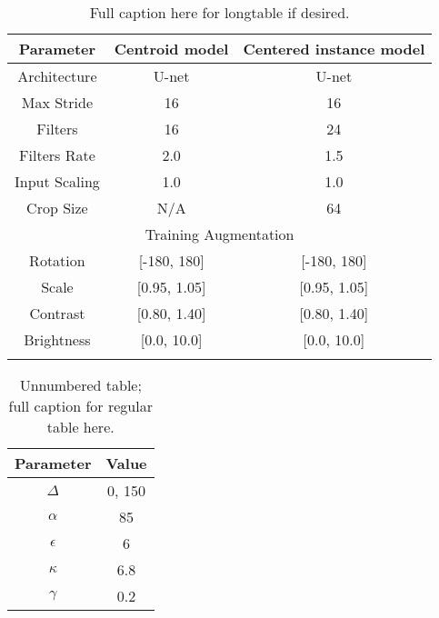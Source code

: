 \begin{longtable}[c]{ c | c c }
    \caption{Short caption heading.\label{tab-values}}\\

    \hline
    Parameter & Centroid model & Centered instance model\\
    \hline
    \endfirsthead

    Architecture & U-net & U-net \\
    Max Stride & 16 & 16 \\
    Filters & 16 & 24 \\
    Filters Rate & 2.0 & 1.5 \\
    Input Scaling & 1.0 & 1.0 \\
    Crop Size & N/A & 64 \\

    \hline
    \multicolumn{3}{c}{Training Augmentation} \\
    \hline

    Rotation & [-180, 180] &  [-180, 180] \\
    Scale & [0.95, 1.05] &  [0.95, 1.05] \\
    Contrast & [0.80, 1.40] &  [0.80, 1.40] \\
    Brightness & [0.0, 10.0] &  [0.0, 10.0] \\

    \caption*{Full caption here for longtable if desired.}

\end{longtable}

\begin{table}
\begin{tabular}{c|c}
    Parameter & Value \\ \hline \hline

    $\Delta$ & 0, 150 \\
    ${\alpha}$ & 85 \\
    ${\epsilon}$ & 6 \\
    ${\kappa}$ & 6.8 \\
    ${\gamma}$ & 0.2

    \caption*{Unnumbered table; full caption for regular table here.}
\end{tabular}
\end{table}
